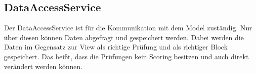 \subsection{DataAccessService}\label{subsec:dataaccessservice}
Der DataAccessService ist für die Kommunikation mit dem Model zuständig.
Nur über diesen können Daten abgefragt und gespeichert werden.
Dabei werden die Daten im Gegensatz zur View als richtige Prüfung und als richtiger Block gespeichert.
Das heißt, dass die Prüfungen kein Scoring besitzen und auch direkt verändert werden können.

